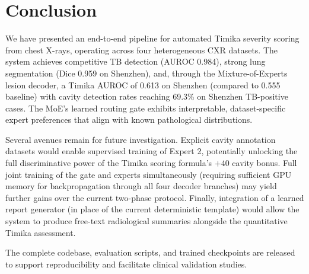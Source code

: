 \documentclass{article}
\begin{document}
\section{Conclusion}

We have presented an end-to-end pipeline for automated Timika severity scoring from chest X-rays, operating across four heterogeneous CXR datasets. The system achieves competitive TB detection (AUROC 0.984), strong lung segmentation (Dice 0.959 on Shenzhen), and, through the Mixture-of-Experts lesion decoder, a Timika AUROC of 0.613 on Shenzhen (compared to 0.555 baseline) with cavity detection rates reaching 69.3\% on Shenzhen TB-positive cases. The MoE's learned routing gate exhibits interpretable, dataset-specific expert preferences that align with known pathological distributions.

Several avenues remain for future investigation. Explicit cavity annotation datasets would enable supervised training of Expert 2, potentially unlocking the full discriminative power of the Timika scoring formula's $+40$ cavity bonus. Full joint training of the gate and experts simultaneously (requiring sufficient GPU memory for backpropagation through all four decoder branches) may yield further gains over the current two-phase protocol. Finally, integration of a learned report generator (in place of the current deterministic template) would allow the system to produce free-text radiological summaries alongside the quantitative Timika assessment.

The complete codebase, evaluation scripts, and trained checkpoints are released to support reproducibility and facilitate clinical validation studies.



\end{document}
